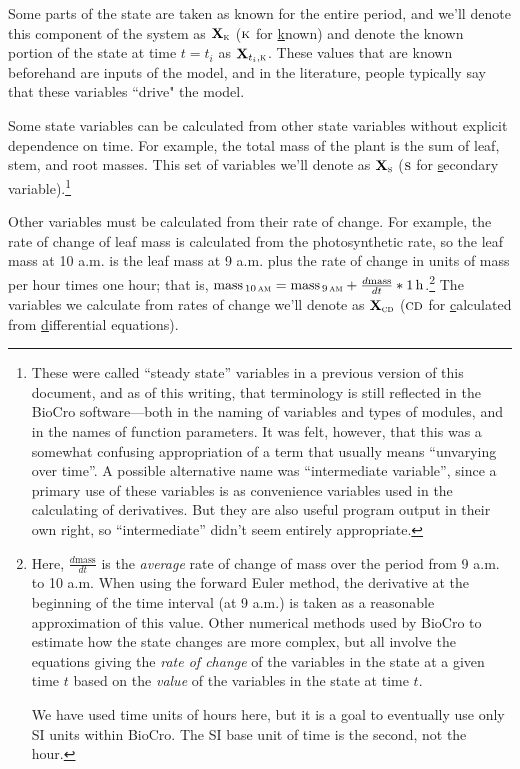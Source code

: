 \documentclass{article}\usepackage[]{graphicx}\usepackage[]{color}
\newcommand{\boldX}{\mathbf{X}}
\newcommand{\cd}{\textsc{cd}}
\newcommand{\kn}{\textsc{k}} %
\newcommand{\s}{\textsc{s}} %
\begin{document}
Some parts of the state are taken as known for the entire period, and
we'll denote this component of the system as $\boldX_\kn$ ($\kn$ for
\underline{k}nown) and denote the known portion of the state at time
$t = t_i$ as $\boldX_{t_i,\kn}$. These values that are known
beforehand are inputs of the model, and in the literature, people
typically say that these variables ``drive" the model.

Some state variables can be calculated from other state variables
without explicit dependence on time. For example, the total mass of
the plant is the sum of leaf, stem, and root masses.  This set of
variables we'll denote as $\boldX_\s$ ({$\s$} for
\underline{s}econdary variable).\footnote{These were called ``steady
  state'' variables in a previous version of this document, and as of
  this writing, that terminology is still reflected in the BioCro
  software---both in the naming of variables and types of modules, and
  in the names of function parameters.  It was felt, however, that
  this was a somewhat confusing appropriation of a term that usually
  means ``unvarying over time''.  A possible alternative name was
  ``intermediate variable'', since a primary use of these variables is
  as convenience variables used in the calculating of derivatives.
  But they are also useful program output in their own right, so
  ``intermediate'' didn't seem entirely appropriate.}

Other variables must be calculated from their rate of change. For
example, the rate of change of leaf mass is calculated from the
photosynthetic rate, so the leaf mass at 10 a.m. is the leaf mass at 9
a.m. plus the rate of change in units of mass per hour times one hour;
that is, $\mathrm{mass}_\text{\,10\,\textsc{am}} =
\mathrm{mass}_\text{\,9\,\textsc{am}} + \frac{d\mathrm{mass}}{dt} *
\SI{1}{h}$.\footnote{Here, $\frac{d\mathrm{mass}}{dt}$ is the
  \emph{average} rate of change of mass over the period from 9 a.m. to
  10 a.m.  When using the forward Euler method, the derivative at the
  beginning of the time interval (at 9 a.m.) is taken as a reasonable
  approximation of this value.  Other numerical methods used by BioCro
  to estimate how the state changes are more complex, but all involve
  the equations giving the \emph{rate of change} of the variables in
  the state at a given time $t$ based on the \emph{value} of the
  variables in the state at time $t$.

  We have used time units of hours here, but it is a goal to
  eventually use only SI units within BioCro.  The SI base unit of
  time is the second, not the hour.} The variables we calculate from
  rates of change we'll denote as $\boldX_\cd$ ($\cd$ for
  \underline{c}alculated from \underline{d}ifferential equations).
\end{document}
